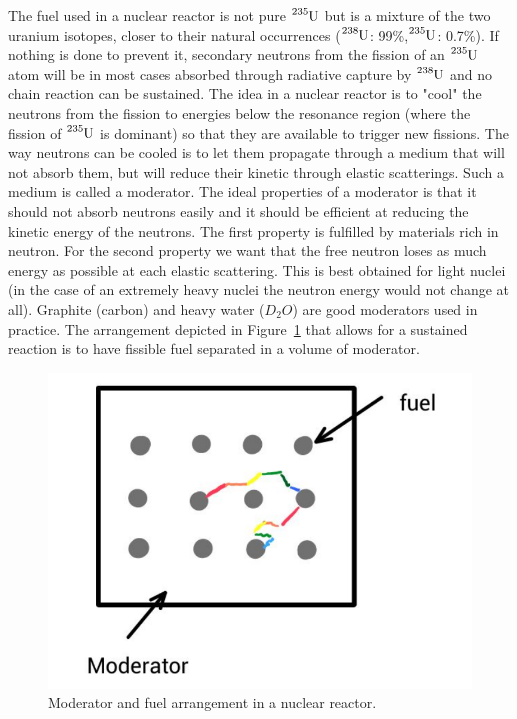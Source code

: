 \documentclass[12pt]{article}
\begin{document}
The fuel used in a nuclear reactor is not pure $\ce{^{235}U}$ but is a mixture of the two uranium isotopes, closer to their natural occurrences ($\ce{^{238}U}$: 99\%,$\ce{^{235}U}$: 0.7\%). If nothing is done to prevent it, secondary neutrons from the fission of an $\ce{^{235}U}$ atom will be in most cases absorbed through radiative capture by $\ce{^{238}U}$ and no chain reaction can be sustained. The idea in a nuclear reactor is to "cool" the neutrons from the fission to energies below the resonance region (where the fission of $\ce{^{235}U}$ is dominant) so that they are available to trigger new fissions. The way neutrons can be cooled is to let them propagate through a medium that will not absorb them, but will reduce their kinetic through elastic scatterings. Such a medium is called a moderator. The ideal properties of a moderator is that it should not absorb neutrons easily and it should be efficient at reducing the kinetic energy of the neutrons. The first property is fulfilled by materials rich in neutron. For the second property we want that the free neutron loses as much energy as possible at each elastic scattering. This is best obtained for light nuclei (in the case of an extremely heavy nuclei the neutron energy would not change at all). Graphite (carbon) and heavy water ($D_2O$) are good moderators used in practice. The arrangement depicted in Figure~\ref{fig:reactor} that allows for a sustained reaction is to have fissible fuel separated in a volume of moderator.       
\begin{figure}
\begin{center}
\includegraphics[scale=0.3]{images/reactor.png}   
\end{center}
\caption{Moderator and fuel arrangement in a nuclear reactor.}\label{fig:reactor}
\end{figure} 
\clearpage
%
\end{document}
